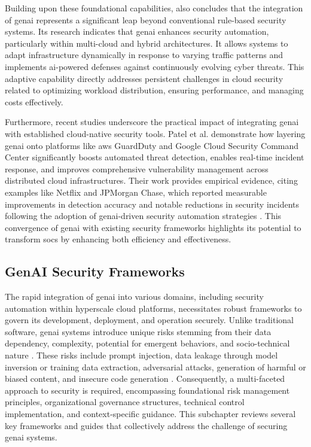 Building upon these foundational capabilities, \cite{seth_ai_2025} also concludes that the integration of \gls{genai} represents a significant leap beyond conventional rule-based security systems. Its research indicates that \gls{genai} enhances security automation, particularly within multi-cloud and hybrid architectures. It allows systems to adapt infrastructure dynamically in response to varying traffic patterns and implements \gls{ai}-powered defenses against continuously evolving cyber threats. This adaptive capability directly addresses persistent challenges in cloud security related to optimizing workload distribution, ensuring performance, and managing costs effectively.

Furthermore, recent studies underscore the practical impact of integrating \gls{genai} with established cloud-native security tools. Patel et al. \cite{patel_generative_2025} demonstrate how layering \gls{genai} onto platforms like \gls{aws} GuardDuty and Google Cloud Security Command Center significantly boosts automated threat detection, enables real-time incident response, and improves comprehensive vulnerability management across distributed cloud infrastructures. Their work provides empirical evidence, citing examples like Netflix and JPMorgan Chase, which reported measurable improvements in detection accuracy and notable reductions in security incidents following the adoption of \gls{genai}-driven security automation strategies \cite{patel_generative_2025}. This convergence of \gls{genai} with existing security frameworks highlights its potential to transform \glspl{soc} by enhancing both efficiency and effectiveness.


\subsection{GenAI Security Frameworks}
\label{sec:GenAI Security Frameworks}

The rapid integration of \gls{genai} into various domains, including security automation within hyperscale cloud platforms, necessitates robust frameworks to govern its development, deployment, and operation securely. Unlike traditional software, \gls{genai} systems introduce unique risks stemming from their data dependency, complexity, potential for emergent behaviors, and socio-technical nature \cite{tabassi_artificial_2023}. These risks include prompt injection, data leakage through model inversion or training data extraction, adversarial attacks, generation of harmful or biased content, and insecure code generation \cite{haryanto_secgenai_2024, hansen_introducing_2023}. Consequently, a multi-faceted approach to security is required, encompassing foundational risk management principles, organizational governance structures, technical control implementation, and context-specific guidance. This subchapter reviews several key frameworks and guides that collectively address the challenge of securing \gls{genai} systems.


